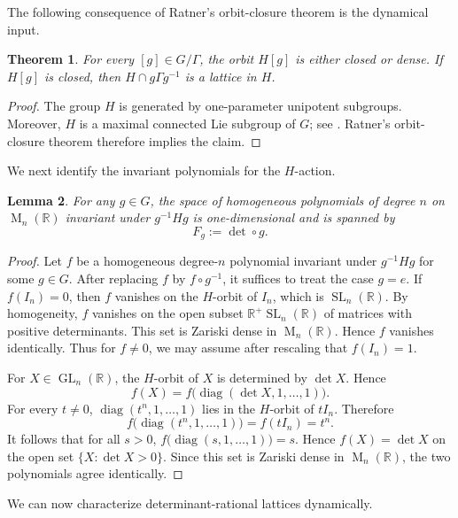 \documentclass[reqno,11pt]{amsart}
\numberwithin{equation}{section}
\newtheorem{theorem}{Theorem}[section]
\newtheorem{lemma}[theorem]{Lemma}
\theoremstyle{definition}
\theoremstyle{remark}
\newcommand{\op}{\operatorname}
\newcommand{\br}{\mathbb R}
\newcommand{\M}{\op{M}}
\newcommand{\GL}{\op{GL}}
\newcommand{\SL}{\op{SL}}
\begin{document}
The following consequence of Ratner's orbit-closure theorem \cite{ratner:1991} is the
dynamical input.

\begin{theorem}
\label{rat}
For every $[g]\in G/\Gamma$, the orbit $H[g]$ is either closed or
dense. If $H[g]$ is closed, then
$ H\cap g\Gamma g^{-1}$
is a lattice in $H$.
\end{theorem}

\begin{proof}
The group $H$ is
generated by one-parameter unipotent subgroups. Moreover, $H$ is a
maximal connected Lie subgroup of $G$; see \cite{dynkin}. Ratner's
orbit-closure theorem \cite{ratner:1991} therefore implies the claim.
\end{proof}

We next identify the invariant polynomials for the $H$-action.

\begin{lemma}
\label{detuni}
For any $g\in G$, the space of homogeneous  polynomials of degree $n$ on
$\M_n(\mathbb R)$ invariant under $g^{-1}Hg$ is one-dimensional and is
spanned by
$$
    F_g:=\det\circ g.
$$
\end{lemma}

\begin{proof}  Let $f$ be a homogeneous degree-$n$ polynomial invariant under
$g^{-1} Hg $ for some $g\in G$.
After replacing $f$ by $f\circ g^{-1}$, it suffices to treat the case
$g=e$. If $f(I_n)=0$, then $f$ vanishes on the $H$-orbit of $I_n$,
which is $\SL_n(\mathbb R)$. By homogeneity, $f$ vanishes on
the open subset $\br^+\SL_n(\mathbb R) $ of matrices with positive determinants. This set is Zariski dense in  
$\M_n(\br)$. Hence $f$ vanishes identically. Thus for $f\ne 0$, we may assume after rescaling that
$f(I_n)=1$.

For $X\in\GL_n(\mathbb R)$, the $H$-orbit of $X$ is determined by
$\det X$. Hence
$$
    f(X)=
    f\bigl(\operatorname{diag}(\det X,1,\ldots,1)\bigr).
$$
For every $t\ne0$, $\operatorname{diag}(t^n,1,\ldots,1)$
lies in the $H$-orbit of $tI_n$. Therefore
$$
    f\bigl(\operatorname{diag}(t^n,1,\ldots,1)\bigr)
    =
    f(tI_n)=t^n.
$$
It follows that for all $s>0$, 
$ f\bigl(\operatorname{diag}(s,1,\ldots,1)\bigr)=s$.
  Hence $f(X)=\det X$ on the open set
$\{X:\det X>0\}$. Since this set is Zariski dense in
$\M_n(\mathbb R)$, the two polynomials agree identically.
\end{proof}

We can now characterize determinant-rational lattices dynamically.
\end{document}

